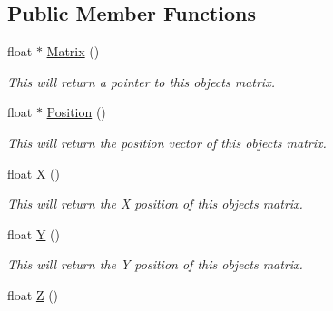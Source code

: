 \subsection*{Public Member Functions}
\begin{DoxyCompactItemize}
\item 
\hypertarget{classc_camera_matrix4_ad8aad043cd8c21d5323b56cbcc90ef78}{
float $\ast$ \hyperlink{classc_camera_matrix4_ad8aad043cd8c21d5323b56cbcc90ef78}{Matrix} ()}
\label{classc_camera_matrix4_ad8aad043cd8c21d5323b56cbcc90ef78}

\begin{DoxyCompactList}\small\item\em This will return a pointer to this objects matrix. \end{DoxyCompactList}\item 
\hypertarget{classc_camera_matrix4_a89fba901320f6dda9a6b92bac09db915}{
float $\ast$ \hyperlink{classc_camera_matrix4_a89fba901320f6dda9a6b92bac09db915}{Position} ()}
\label{classc_camera_matrix4_a89fba901320f6dda9a6b92bac09db915}

\begin{DoxyCompactList}\small\item\em This will return the position vector of this objects matrix. \end{DoxyCompactList}\item 
\hypertarget{classc_camera_matrix4_a0133c16b734fa93e767ea89964799fb5}{
float \hyperlink{classc_camera_matrix4_a0133c16b734fa93e767ea89964799fb5}{X} ()}
\label{classc_camera_matrix4_a0133c16b734fa93e767ea89964799fb5}

\begin{DoxyCompactList}\small\item\em This will return the X position of this objects matrix. \end{DoxyCompactList}\item 
\hypertarget{classc_camera_matrix4_aec72cb78c62b2e0970824262b0b4aa1f}{
float \hyperlink{classc_camera_matrix4_aec72cb78c62b2e0970824262b0b4aa1f}{Y} ()}
\label{classc_camera_matrix4_aec72cb78c62b2e0970824262b0b4aa1f}

\begin{DoxyCompactList}\small\item\em This will return the Y position of this objects matrix. \end{DoxyCompactList}\item 
\hypertarget{classc_camera_matrix4_a7e3030fcedbd3b74270b26ea2b61904c}{
float \hyperlink{classc_camera_matrix4_a7e3030fcedbd3b74270b26ea2b61904c}{Z} ()}
\label{classc_camera_matrix4_a7e3030fcedbd3b74270b26ea2b61904c}


\end{DoxyCompactItemize}
